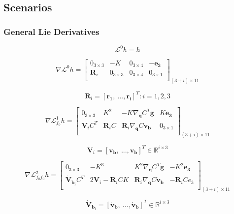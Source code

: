 \documentclass[]{article}
\begin{document}
\subsection{Scenarios}
\subsubsection{General Lie Derivatives}
\begin{equation*}
\mathcal{L}^0h = h
\end{equation*}

\begin{equation*}
\nabla\mathcal{L}^0h = \begin{bmatrix}
0_{3\times 3}& -K& 0_{3\times 4}& -\bm{e_3}\\
\bm{R}_i & 0_{3\times 3} & 0_{3\times 4} & 0_{3\times 1}\\
\end{bmatrix}_{(3+i)\times 11}
\end{equation*}

\begin{equation*}
\bm{R}_i = [\bm{r_1},\ ..., \bm{r_i}]^T : i = 1,2,3
\end{equation*}

\begin{equation*}
\nabla\mathcal{L}^1_{f_0}h = \begin{bmatrix}
0_{3\times 3}& K^2& -K\nabla_{\bm{q}} C^T\bm{g}& K\bm{e_3}\\
\bm{V}_i C^T & \bm{R}_iC & \bm{R}_i\nabla_{\bm{q}} C\bm{v_b} & 0_{3\times 1}\\
\end{bmatrix}_{(3+i)\times 11}
\end{equation*}

\begin{equation*}
\bm{V}_i = [\bm{v_b},\ ..., \bm{v_b}]^T \in \mathbb{R}^{i\times 3}
\end{equation*}

\begin{equation*}
\nabla\mathcal{L}^2_{f_0f_0}h = \begin{bmatrix}
0_{3\times 3}& -K^3& K^2\nabla_{\bm{q}} C^T\bm{g}& -K^2\bm{e_3}\\
\bm{\dot{V}}_{\bm{b}_i} C^T & 2\bm{V}_i - \bm{R}_iCK & \bm{R}_i\nabla_{\bm{q}} C\bm{\dot{v}_b} & -\bm{R}_iCe_3\\
\end{bmatrix}_{(3+i)\times 11}
\end{equation*}

\begin{equation*}
\bm{\dot{V}}_{\bm{b}_i} = [\bm{\dot{v}_b},\ ..., \bm{\dot{v}_b}]^T \in \mathbb{R}^{i\times 3}
\end{equation*}
\end{document}
